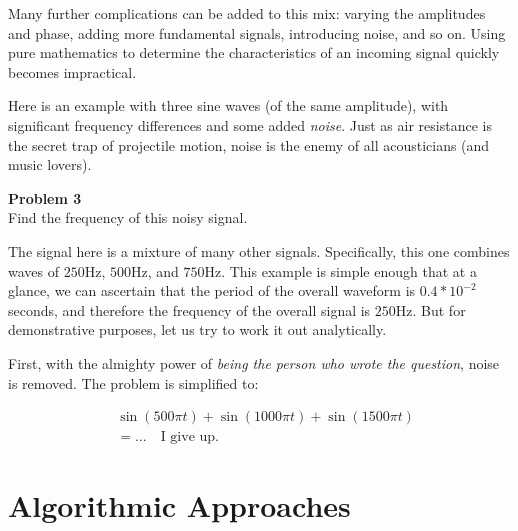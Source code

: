 \documentclass{article}
\newenvironment{problem}[2][Problem]
    { \begin{mdframed}[backgroundcolor=gray!20] \textbf{#1 #2} \\ }
    { \end{mdframed} }
\begin{document}
Many further complications can be added to this mix: varying the amplitudes and phase, adding more fundamental signals, introducing noise, and so on. Using pure mathematics to determine the characteristics of an incoming signal quickly becomes impractical. 

Here is an example with three sine waves (of the same amplitude), with significant frequency differences and some added \emph{noise}. Just as air resistance is the secret trap of projectile motion, noise is the enemy of all acousticians (and music lovers).

\begin{problem}{3}

Find the frequency of this noisy signal.


\end{problem}

The signal here is a mixture of many other signals. Specifically, this one combines waves of $250$Hz, $500$Hz, and $750$Hz. This example is simple enough that at a glance, we can ascertain that the period of the overall waveform is $0.4 * 10^{-2}$ seconds, and therefore the frequency of the overall signal is $250$Hz. But for demonstrative purposes, let us try to work it out analytically.

First, with the almighty power of \emph{being the person who wrote the question}, noise is removed. The problem is simplified to:

\begin{align*}
    & \sin(500\pi t) + \sin(1000\pi t) + \sin(1500\pi t) \\
    & = ... \quad \text{I give up.}
\end{align*}

\section{Algorithmic Approaches}
\end{document}
